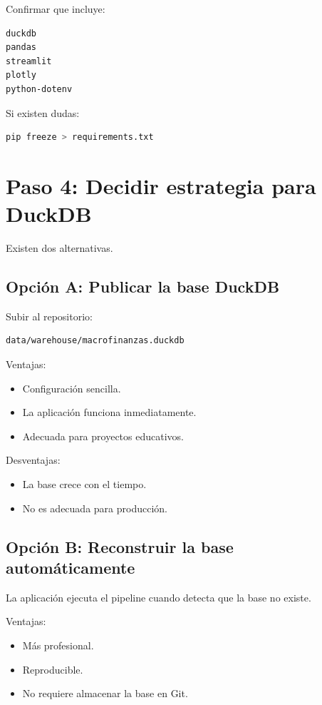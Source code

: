 Confirmar que incluye:

\begin{verbatim}
duckdb
pandas
streamlit
plotly
python-dotenv
\end{verbatim}

Si existen dudas:

\begin{lstlisting}[language=bash]
pip freeze > requirements.txt
\end{lstlisting}

\section{Paso 4: Decidir estrategia para DuckDB}

Existen dos alternativas.

\subsection{Opción A: Publicar la base DuckDB}

Subir al repositorio:

\begin{verbatim}
data/warehouse/macrofinanzas.duckdb
\end{verbatim}

Ventajas:

\begin{itemize}
\item Configuración sencilla.
\item La aplicación funciona inmediatamente.
\item Adecuada para proyectos educativos.
\end{itemize}

Desventajas:

\begin{itemize}
\item La base crece con el tiempo.
\item No es adecuada para producción.
\end{itemize}

\subsection{Opción B: Reconstruir la base automáticamente}

La aplicación ejecuta el pipeline cuando detecta que la base no existe.

Ventajas:

\begin{itemize}
\item Más profesional.
\item Reproducible.
\item No requiere almacenar la base en Git.
\end{itemize}


